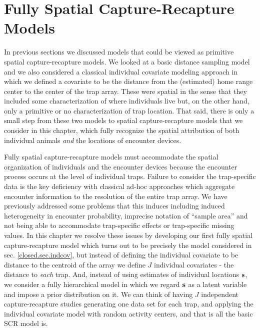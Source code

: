 





\chapter{Fully Spatial Capture-Recapture Models}
\label{chapt.scr0}

\vspace{.3in}

In previous sections we discussed models that could be
viewed as primitive spatial capture-recapture models. We looked at a
basic distance sampling model and we also considered a classical
individual covariate modeling approach in which we defined a covariate
to be the distance from the (estimated) home range center to the center of
the trap array. These were spatial in the sense that they included
some characterization of where individuals live but, on the other
hand, only a primitive or no characterization of trap location.  That
said, there is only a small step from these two models to spatial
capture-recapture models that we consider in this chapter, which fully
recognize the spatial attribution of both individual animals {\it and}
the locations of encounter devices.

Fully spatial capture-recapture models must accommodate the spatial
organization of individuals and the encounter devices because the
encounter process occurs at the level of individual traps.  Failure to
consider the trap-specific data is the key deficiency
with classical ad-hoc approaches which aggregate encounter information
to the resolution of the entire trap array. We have  previously
addressed some problems that this induces including induced
heterogeneity in encounter probability, imprecise notation of ``sample
area'' and not being able to accommodate trap-specific
effects or trap-specific missing values.
In this chapter we resolve these issues by developing 
our first fully spatial capture-recapture
model which turns out to be precisely the model considered in sec. \ref{closed.sec.indcov},
 but instead of defining the individual covariate to be distance
to the centroid of the array we define $J$ individual covariates - the
distance to {\it each} trap. And, instead of using estimates of
individual locations ${\bf s}$, we consider a fully hierarchical model in
which we regard ${\bf s}$ as a latent variable and impose a prior
distribution on it.  We can think of having $J$ independent
capture-recapture studies generating one data set for each trap, and
applying the individual covariate model with random activity centers,
and that is all the basic SCR model is.

